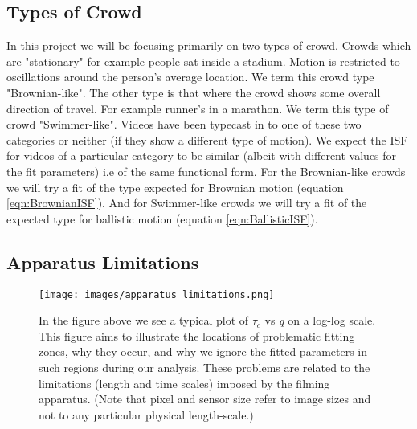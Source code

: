 \documentclass[11pt]{article}
\begin{document}
\subsection{Types of Crowd}
\label{section:crowdtypes}
In this project we will be focusing primarily on two types of crowd. Crowds which are "stationary" for example people sat inside a stadium. Motion is restricted to oscillations around the person's average location. We term this crowd type "Brownian-like". The other type is that where the crowd shows some overall direction of travel. For example runner's in a marathon. We term this type of crowd "Swimmer-like". Videos have been typecast in to one of these two categories or neither (if they show a different type of motion). We expect the ISF for videos of a particular category to be similar (albeit with different values for the fit parameters) i.e of the same functional form. For the Brownian-like crowds we will try a fit of the type expected for Brownian motion (equation \ref{eqn:BrownianISF}). And for Swimmer-like crowds we will try a fit of the expected type for ballistic motion (equation \ref{eqn:BallisticISF}).

\subsection{Apparatus Limitations}
\label{section:fitting_issues}
\begin{figure}[H]
\centering
\centerline{\texttt{[image: images/apparatus\_limitations.png]}}
\caption{
In the figure above we see a typical plot of $\tau_c$ vs  \textit{q} on a log-log scale. This figure aims to illustrate the locations of problematic fitting zones, why they occur, and why we ignore the fitted parameters in such regions during our analysis. These problems are related to the limitations (length and time scales) imposed by the filming apparatus. (Note that pixel and sensor size refer to image sizes and not to any particular physical length-scale.)
}
\end{figure}
\end{document}
